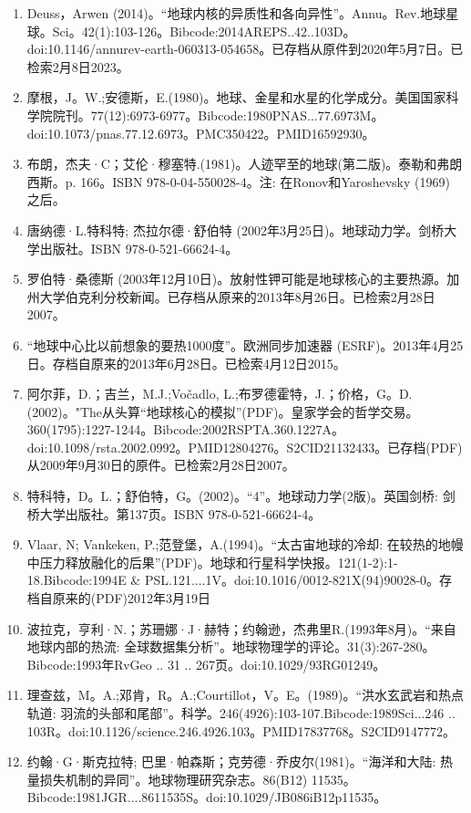 \begin{enumerate}
\item Deuss，Arwen (2014)。“地球内核的异质性和各向异性”。Annu。Rev.地球星球。Sci。42(1):103-126。Bibcode:2014AREPS..42..103D。doi:10.1146/annurev-earth-060313-054658。已存档从原件到2020年5月7日。已检索2月8日2023。
\item 摩根，J。W.;安德斯，E.(1980)。地球、金星和水星的化学成分。美国国家科学院院刊。77(12):6973-6977。Bibcode:1980PNAS...77.6973M。doi:10.1073/pnas.77.12.6973。PMC350422。PMID16592930。  
\item 布朗，杰夫·C；艾伦·穆塞特.(1981)。人迹罕至的地球(第二版)。泰勒和弗朗西斯。p. 166。ISBN 978-0-04-550028-4。注: 在Ronov和Yaroshevsky (1969) 之后。
\item 唐纳德·L.特科特; 杰拉尔德·舒伯特 (2002年3月25日)。地球动力学。剑桥大学出版社。ISBN 978-0-521-66624-4。
\item 罗伯特·桑德斯 (2003年12月10日)。放射性钾可能是地球核心的主要热源。加州大学伯克利分校新闻。已存档从原来的2013年8月26日。已检索2月28日2007。
\item “地球中心比以前想象的要热1000度”。欧洲同步加速器 (ESRF)。2013年4月25日。存档自原来的2013年6月28日。已检索4月12日2015。
\item 阿尔菲，D.；吉兰，M.J.;Vočadlo, L.;布罗德霍特，J.；价格，G。D.(2002)。"The从头算“地球核心的模拟”(PDF)。皇家学会的哲学交易。360(1795):1227-1244。Bibcode:2002RSPTA.360.1227A。doi:10.1098/rsta.2002.0992。PMID12804276。S2CID21132433。已存档(PDF)从2009年9月30日的原件。已检索2月28日2007。   
\item 特科特，D。L.；舒伯特，G。(2002)。“4”。地球动力学(2版)。英国剑桥: 剑桥大学出版社。第137页。ISBN 978-0-521-66624-4。
\item Vlaar, N; Vankeken, P.;范登堡，A.(1994)。“太古宙地球的冷却: 在较热的地幔中压力释放融化的后果”(PDF)。地球和行星科学快报。121(1-2):1-18.Bibcode:1994E & PSL.121....1V。doi:10.1016/0012-821X(94)90028-0。存档自原来的(PDF)2012年3月19日
\item 波拉克，亨利·N.；苏珊娜·J·赫特；约翰逊，杰弗里R.(1993年8月)。“来自地球内部的热流: 全球数据集分析”。地球物理学的评论。31(3):267-280。Bibcode:1993年RvGeo .. 31 .. 267页。doi:10.1029/93RG01249。
\item 理查兹，M。A.;邓肯，R。A.;Courtillot，V。E。(1989)。“洪水玄武岩和热点轨道: 羽流的头部和尾部”。科学。246(4926):103-107.Bibcode:1989Sci...246 .. 103R。doi:10.1126/science.246.4926.103。PMID17837768。S2CID9147772。  
\item 约翰·G·斯克拉特; 巴里·帕森斯；克劳德·乔皮尔(1981)。“海洋和大陆: 热量损失机制的异同”。地球物理研究杂志。86(B12) 11535。Bibcode:1981JGR....8611535S。doi:10.1029/JB086iB12p11535。

\end{enumerate}

